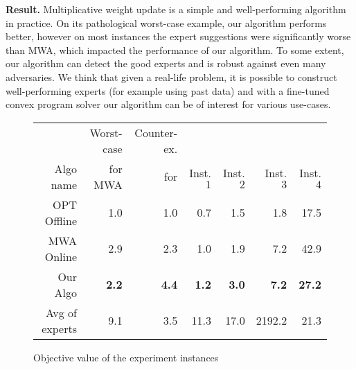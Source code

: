 \textbf{Result.} Multiplicative weight update is a simple and well-performing algorithm in practice. On its pathological worst-case example, our algorithm performs better, however on most instances the expert suggestions were significantly worse than MWA, which impacted the performance of our algorithm. To some extent, our algorithm can detect the good experts and is robust against even many adversaries. We think that given a real-life problem, it is possible to construct well-performing experts (for example using past data) and with a fine-tuned convex program solver our algorithm can be of interest for various use-cases.

\begin{figure}[!ht]
\centering
\begin{tabular}{r|r|r|r|r|r|r}
          & Worst-case & Counter-ex. & & & & \\
Algo name & for MWA  & for \cite{AnandGe22:Online-Algorithms} & Inst. $1$ & Inst. $2$ & Inst. $3$ & Inst. $4$\\
\hline
OPT Offline            & 1.0 & 1.0 & 0.7 & 1.5 & 1.8 & 17.5 \\
MWA Online             & 2.9 & 2.3 & 1.0 & 1.9 & 7.2 & 42.9 \\
\hline
Our Algo           & {\bf 2.2} & {\bf 4.4} & {\bf 1.2} & {\bf 3.0} & {\bf 7.2}  & {\bf 27.2} \\
\hline
Avg of experts      & 9.1 & 3.5 & 11.3 & 17.0 & 2192.2 & 21.3 \\
\end{tabular}
\caption{Objective value of the experiment instances}
\label{fig:exp-objective}
\end{figure}

